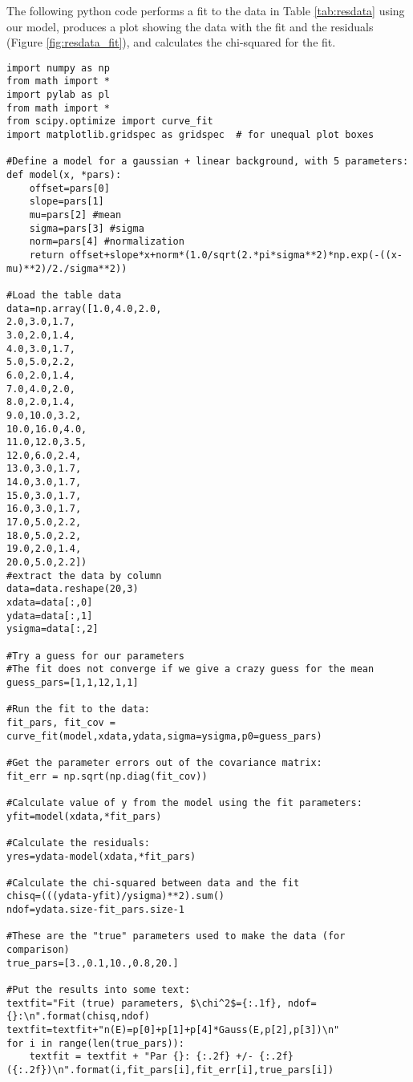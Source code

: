The following python code performs a fit to the data in Table \ref{tab:resdata} using our model, produces a plot showing the data with the fit and the residuals (Figure \ref{fig:resdata_fit}), and calculates the chi-squared for the fit. 
\begin{lstlisting}[frame=single] 
import numpy as np
from math import *
import pylab as pl
from math import *
from scipy.optimize import curve_fit 
import matplotlib.gridspec as gridspec  # for unequal plot boxes

#Define a model for a gaussian + linear background, with 5 parameters:
def model(x, *pars):
    offset=pars[0]
    slope=pars[1]
    mu=pars[2] #mean
    sigma=pars[3] #sigma
    norm=pars[4] #normalization
    return offset+slope*x+norm*(1.0/sqrt(2.*pi*sigma**2)*np.exp(-((x-mu)**2)/2./sigma**2))
    
#Load the table data
data=np.array([1.0,4.0,2.0,
2.0,3.0,1.7,
3.0,2.0,1.4,
4.0,3.0,1.7,
5.0,5.0,2.2,
6.0,2.0,1.4,
7.0,4.0,2.0,
8.0,2.0,1.4,
9.0,10.0,3.2,
10.0,16.0,4.0,
11.0,12.0,3.5,
12.0,6.0,2.4,
13.0,3.0,1.7,
14.0,3.0,1.7,
15.0,3.0,1.7,
16.0,3.0,1.7,
17.0,5.0,2.2,
18.0,5.0,2.2,
19.0,2.0,1.4,
20.0,5.0,2.2])
#extract the data by column
data=data.reshape(20,3)
xdata=data[:,0]
ydata=data[:,1]
ysigma=data[:,2]

#Try a guess for our parameters
#The fit does not converge if we give a crazy guess for the mean
guess_pars=[1,1,12,1,1]

#Run the fit to the data:
fit_pars, fit_cov = curve_fit(model,xdata,ydata,sigma=ysigma,p0=guess_pars)

#Get the parameter errors out of the covariance matrix:
fit_err = np.sqrt(np.diag(fit_cov))

#Calculate value of y from the model using the fit parameters:    
yfit=model(xdata,*fit_pars)   

#Calculate the residuals:
yres=ydata-model(xdata,*fit_pars)

#Calculate the chi-squared between data and the fit
chisq=(((ydata-yfit)/ysigma)**2).sum()
ndof=ydata.size-fit_pars.size-1

#These are the "true" parameters used to make the data (for comparison)
true_pars=[3.,0.1,10.,0.8,20.]

#Put the results into some text:
textfit="Fit (true) parameters, $\chi^2$={:.1f}, ndof={}:\n".format(chisq,ndof)
textfit=textfit+"n(E)=p[0]+p[1]+p[4]*Gauss(E,p[2],p[3])\n"
for i in range(len(true_pars)):
    textfit = textfit + "Par {}: {:.2f} +/- {:.2f} ({:.2f})\n".format(i,fit_pars[i],fit_err[i],true_pars[i])


\end{lstlisting}
